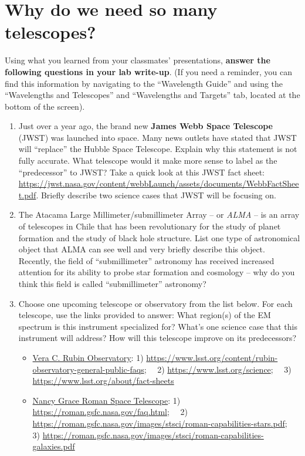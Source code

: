 \documentclass[11pt]{article}
\begin{document}
\section{Why do we need so many telescopes?}
Using what you learned from your classmates' presentations, \textbf{answer the following questions in your lab write-up}.  (If you need a reminder, you can find this information by navigating to the ``Wavelength Guide'' and using the ``Wavelengths and Telescopes'' and ``Wavelengths and Targets'' tab, located at the bottom of the screen).
\begin{enumerate}
    \item Just over a year ago, the brand new \textbf{James Webb Space Telescope} (JWST) was launched into space. Many news outlets have stated that JWST will ``replace'' the Hubble Space Telescope. Explain why this statement is not fully accurate. What telescope would it make more sense to label as the ``predecessor'' to JWST? Take a quick look at this JWST fact sheet: \url{https://jwst.nasa.gov/content/webbLaunch/assets/documents/WebbFactSheet.pdf}. Briefly describe two science cases that JWST will be focusing on.
    
    \item The Atacama Large Millimeter/submillimeter Array -- or \emph{ALMA} -- is an array of telescopes in Chile that has been revolutionary for the study of planet formation and the study of black hole structure. List one type of astronomical object that ALMA can see well and very briefly describe this object. Recently, the field of ``submillimeter'' astronomy has received increased attention for its ability to probe star formation and cosmology -- why do you think this field is called ``submillimeter'' astronomy? 
    
    \item Choose one upcoming telescope or observatory from the list below. For each telescope, use the links provided to answer: What region(s) of the EM spectrum is this instrument specialized for? What's one science case that this instrument will address? How will this telescope improve on its predecessors?
    \begin{itemize}
        \item \underline{Vera C. Rubin Observatory}: 1) \url{https://www.lsst.org/content/rubin-observatory-general-public-faqs}; \, \, 2) \url{https://www.lsst.org/science}; \, \, 3) \url{https://www.lsst.org/about/fact-sheets}
        
        \item \underline{Nancy Grace Roman Space Telescope}: 1) \url{https://roman.gsfc.nasa.gov/faq.html}; \, \, 2) \url{https://roman.gsfc.nasa.gov/images/stsci/roman-capabilities-stars.pdf}; \, \, 3) \url{https://roman.gsfc.nasa.gov/images/stsci/roman-capabilities-galaxies.pdf}
        

\end{itemize}
\end{enumerate}
\end{document}

